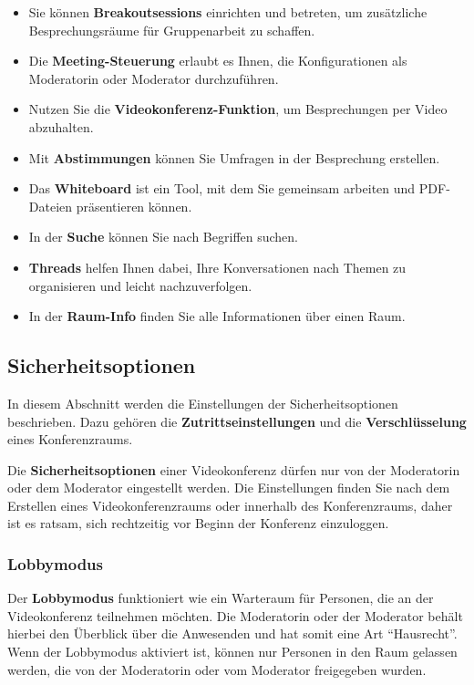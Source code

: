 \documentclass[
  letterpaper,
  DIV=11,
  numbers=noendperiod]{scrreprt}
\providecommand{\tightlist}{%
  \setlength{\itemsep}{0pt}\setlength{\parskip}{0pt}}\usepackage{longtable,booktabs,array}
\begin{document}
\begin{itemize}
\tightlist
\item
  Sie können \textbf{Breakoutsessions} einrichten und betreten, um
  zusätzliche Besprechungsräume für Gruppenarbeit zu schaffen.
\item
  Die \textbf{Meeting-Steuerung} erlaubt es Ihnen, die Konfigurationen
  als Moderatorin oder Moderator durchzuführen.
\item
  Nutzen Sie die \textbf{Videokonferenz-Funktion}, um Besprechungen per
  Video abzuhalten.
\item
  Mit \textbf{Abstimmungen} können Sie Umfragen in der Besprechung
  erstellen.
\item
  Das \textbf{Whiteboard} ist ein Tool, mit dem Sie gemeinsam arbeiten
  und PDF-Dateien präsentieren können.
\item
  In der \textbf{Suche} können Sie nach Begriffen suchen.
\item
  \textbf{Threads} helfen Ihnen dabei, Ihre Konversationen nach Themen
  zu organisieren und leicht nachzuverfolgen.
\item
  In der \textbf{Raum-Info} finden Sie alle Informationen über einen
  Raum.
\end{itemize}

\subsection{Sicherheitsoptionen}\label{sicherheitsoptionen}

In diesem Abschnitt werden die Einstellungen der Sicherheitsoptionen
beschrieben. Dazu gehören die \textbf{Zutrittseinstellungen} und die
\textbf{Verschlüsselung} eines Konferenzraums.

Die \textbf{Sicherheitsoptionen} einer Videokonferenz dürfen nur von der
Moderatorin oder dem Moderator eingestellt werden. Die Einstellungen
finden Sie nach dem Erstellen eines Videokonferenzraums oder innerhalb
des Konferenzraums, daher ist es ratsam, sich rechtzeitig vor Beginn der
Konferenz einzuloggen.

\subsubsection{Lobbymodus}\label{lobbymodus}

Der \textbf{Lobbymodus} funktioniert wie ein Warteraum für Personen, die
an der Videokonferenz teilnehmen möchten. Die Moderatorin oder der
Moderator behält hierbei den Überblick über die Anwesenden und hat somit
eine Art ``Hausrecht''. Wenn der Lobbymodus aktiviert ist, können nur
Personen in den Raum gelassen werden, die von der Moderatorin oder vom
Moderator freigegeben wurden.
\end{document}
